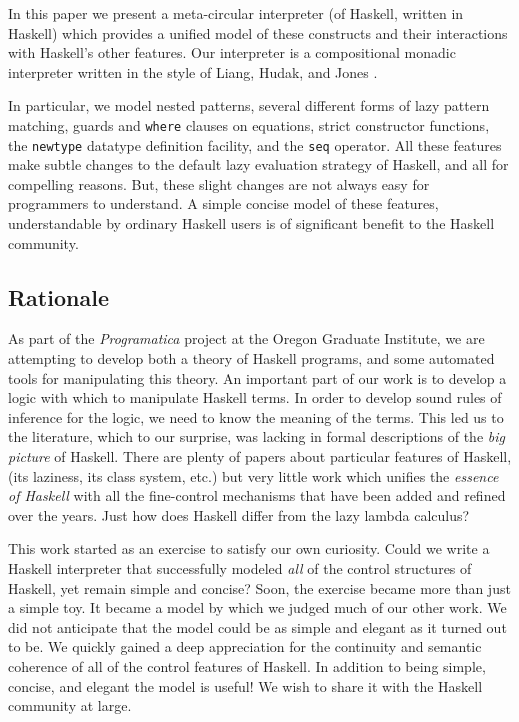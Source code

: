 \documentclass{entcs} \usepackage{entcsmacro}
\begin{document}
In this paper we present a meta-circular\cite{Steele-Sussman78b,Abelson-Sussman-Sussman96,Kamin,Friedman}
interpreter (of Haskell, written in Haskell) which provides a unified model of
these constructs and their interactions with Haskell's other features. Our
interpreter is a compositional monadic interpreter written in the style of
Liang, Hudak, and Jones \cite{LiangHudak}.

In particular, we model nested patterns, several different forms of lazy
pattern matching, guards and {\tt where} clauses on equations, strict
constructor functions, the {\tt newtype} datatype definition facility, and
the {\tt seq} operator. All these features make subtle changes to the
default lazy evaluation strategy of Haskell, and all for compelling reasons.
But, these slight changes are not always easy for programmers to
understand. A simple concise model of these features, understandable by
ordinary Haskell users is of significant benefit to the Haskell community.

\subsection{Rationale}

As part of the {\em Programatica}\cite{programatica} project at the Oregon Graduate
Institute, we are attempting to develop both a theory of Haskell programs, and some
automated tools for manipulating this theory. An important part of our work is to develop a
logic with which to manipulate Haskell terms. In order to develop sound rules of inference
for the logic, we need to know the meaning of the terms. This led us to the literature,
which to our surprise, was lacking in formal descriptions of the {\em big picture} of
Haskell. There are plenty of papers about particular features of Haskell, (its
laziness\cite{PeytonJone92a}, its class system\cite{JonesMark93,Hall:1994:TCH}, etc.) but
very little work which unifies the {\em essence of Haskell} with all the fine-control
mechanisms that have been added and refined over the years. Just how does Haskell differ
from the lazy lambda calculus\cite{Stoy,Gunter}?

This work started as an exercise to satisfy our own curiosity. Could we write a
Haskell interpreter that successfully modeled {\em all} of the control structures of
Haskell, yet remain simple and concise? Soon, the exercise became more than just a
simple toy. It became a model by which we judged much of our other work. We did not
anticipate that the model could be as simple and elegant as it turned out to
be. We quickly gained a deep appreciation for the continuity and semantic coherence of
all of the control features of Haskell. In addition to being simple, concise, and
elegant the model is useful! We wish to share it with the Haskell community at large.
\end{document}

